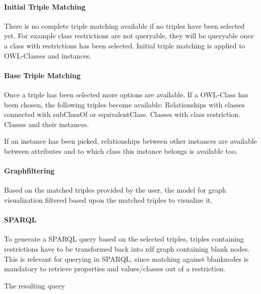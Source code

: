 \paragraph*{Initial Triple Matching}
There is no complete triple matching available if no triples have been selected yet. For example class restrictions are not queryable, they will be queryable once a class
with restrictions has been selected. Initial triple matching is applied to OWL-Classes and instances.

\paragraph*{Base Triple Matching} 
Once a triple has been selected more options are available. 
If a OWL-Class has been chosen, the following triples become available:
Relationships with classes connected with subClassOf or equivalentClass.
Classes with class restriction. 
Classes and their instances. 

If an instance has been picked, relationships between other instances are available
between attributes and to which class this instance belongs is available too.

\paragraph*{Graphfiltering}
Based on the matched triples provided by the user, the model for graph visualization filtered based upon 
the matched triples to visualize it. 

\paragraph*{SPARQL}
To generate a SPARQL query based on the selected triples, triples containing restrictions have to be transformed back into 
rdf graph containing blank nodes. This is relevant for querying in SPARQL, since matching against blanknodes is mandatory to retrieve 
properties and values/classes out of a restriction. 

The resulting query 







